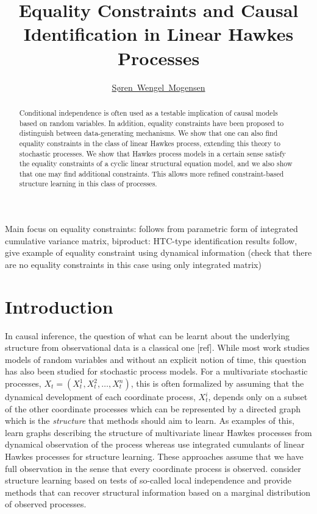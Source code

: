 \documentclass[accepted]{uai2021} %
\title{Equality Constraints and Causal Identification in Linear Hawkes 
Processes}
\author[1]{\href{mailto: Søren Wengel Mogensen 
<swemo@dtu.dk>}{Søren~Wengel~Mogensen}{}}
\affil[1]{%
    Section of Cognitive Systems\\
    Technical University of Denmark\\
    Denmark
}
\begin{document}
\maketitle

\begin{abstract}
Conditional independence is often used as a testable 
implication of causal models based on random variables. In addition, equality 
constraints have been proposed to distinguish between data-generating 
mechanisms. We show that one 
can also find equality constraints in the class of linear Hawkes process, 
extending this theory to stochastic processes. We 
show that Hawkes process models in a certain sense satisfy the equality 
constraints 
of a cyclic linear structural equation model, and we also show that one may 
find additional constraints. This 
allows more refined constraint-based structure learning in this class of 
processes.
\end{abstract}

Main focus on equality constraints: follows from parametric form of integrated 
cumulative variance matrix, biproduct: HTC-type identification results follow, 
give example of equality constraint using dynamical information (check that 
there are no equality constraints in this case using only integrated matrix)


\section{Introduction}\label{sec:intro}

In causal inference, the question of what can be learnt about the underlying 
structure from observational data is a classical one [ref]. While most work 
studies models of random variables and without an explicit notion of time, this 
question has also been 
studied for stochastic process models. For a multivariate stochastic 
processes, $X_t = (X_t^1, X_t^2, \ldots, X_t^n)$, this is often formalized by 
assuming that the dynamical development of each coordinate process, $X_t^i$, 
depends only on a subset of the other coordinate processes which can be 
represented by a directed graph which is the \emph{structure} that methods 
should aim to learn. As examples of this, \cite{eichlerHawkes2017, xu2016} learn
graphs describing the structure of multivariate linear Hawkes processes from 
dynamical observation of the process whereas 
\cite{achab2017} use integrated cumulants of 
linear Hawkes processes for structure learning. 
These approaches assume that we have full observation in the sense that every 
coordinate 
process is observed. \cite{meek2014, mogensenUAI2018, mogensenUAI2020} consider 
structure learning based on tests of so-called local independence and provide 
methods 
that can recover structural information based on a marginal distribution of 
observed processes. 
\end{document}
